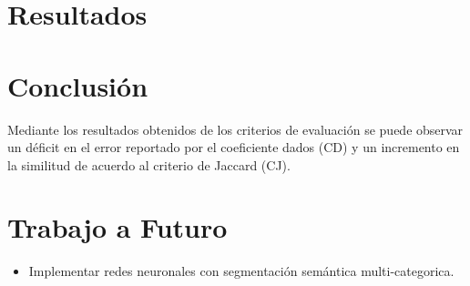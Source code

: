 \documentclass[a0,portrait]{a0poster}
\begin{document}
\begin{multicols}{3}
\section*{Resultados}
\begin{center}\vspace{1cm}
\end{center}\vspace{1cm}    

\section*{Conclusión}
Mediante los resultados obtenidos de los criterios de evaluación se puede observar un déficit en el error reportado por el coeficiente dados (CD) y un incremento en la similitud de acuerdo al criterio de Jaccard (CJ).

\section*{Trabajo a Futuro}
\begin{itemize}
    \item Implementar redes neuronales con segmentación semántica multi-categorica.
\end{itemize}


\end{multicols}
\end{document}
